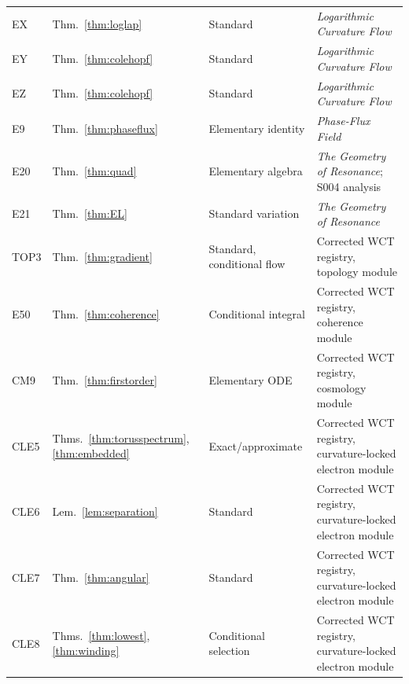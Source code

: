 \documentclass[11pt,letterpaper]{article}
\theoremstyle{definition}
\theoremstyle{remark}
\begin{document}
\begin{longtable}{@{}p{1.0cm}p{1.92cm}p{3.05cm}p{8.0cm}@{}}
EX & Thm.~\ref{thm:loglap} & Standard & \emph{Logarithmic Curvature Flow} \cite{logflow} \\
EY & Thm.~\ref{thm:colehopf} & Standard & \emph{Logarithmic Curvature Flow} \cite{logflow} \\
EZ & Thm.~\ref{thm:colehopf} & Standard & \emph{Logarithmic Curvature Flow} \cite{logflow} \\
E9 & Thm.~\ref{thm:phaseflux} & Elementary identity & \emph{Phase-Flux Field} \cite{pff} \\
E20 & Thm.~\ref{thm:quad} & Elementary algebra & \emph{The Geometry of Resonance}; S004 analysis \cite{geometry,s004} \\
E21 & Thm.~\ref{thm:EL} & Standard variation & \emph{The Geometry of Resonance} \cite{geometry} \\
TOP3 & Thm.~\ref{thm:gradient} & Standard, conditional flow & Corrected WCT registry, topology module \cite{registry} \\
E50 & Thm.~\ref{thm:coherence} & Conditional integral & Corrected WCT registry, coherence module \cite{registry} \\
CM9 & Thm.~\ref{thm:firstorder} & Elementary ODE & Corrected WCT registry, cosmology module \cite{registry} \\
CLE5 & Thms.~\ref{thm:torusspectrum}, \ref{thm:embedded} & Exact/approximate & Corrected WCT registry, curvature-locked electron module \cite{registry} \\
CLE6 & Lem.~\ref{lem:separation} & Standard & Corrected WCT registry, curvature-locked electron module \cite{registry} \\
CLE7 & Thm.~\ref{thm:angular} & Standard & Corrected WCT registry, curvature-locked electron module \cite{registry} \\
CLE8 & Thms.~\ref{thm:lowest}, \ref{thm:winding} & Conditional selection & Corrected WCT registry, curvature-locked electron module \cite{registry} \\
\bottomrule
\end{longtable}
\normalsize
\end{document}
